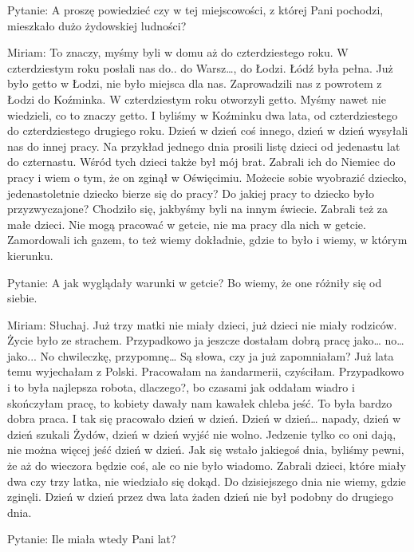  

Pytanie: A proszę powiedzieć czy w tej miejscowości, z której Pani pochodzi, mieszkało dużo żydowskiej ludności? 

Miriam: To znaczy, myśmy byli w domu aż do czterdziestego roku. W czterdziestym roku posłali nas do.. do Warsz…, do Łodzi. Łódź była pełna. Już było getto w Łodzi, nie było miejsca dla nas. Zaprowadzili nas z powrotem z Łodzi do Koźminka. W czterdziestym roku otworzyli getto. Myśmy nawet nie wiedzieli, co to znaczy getto. I byliśmy w Koźminku dwa lata, od czterdziestego do czterdziestego drugiego roku. Dzień w dzień coś innego, dzień w dzień wysyłali nas do innej pracy. Na przykład jednego dnia prosili listę dzieci od jedenastu lat do czternastu. Wśród tych dzieci także był mój brat. Zabrali ich do Niemiec do pracy i wiem o tym, że on zginął w Oświęcimiu. Możecie sobie wyobrazić dziecko, jedenastoletnie dziecko bierze się do pracy? Do jakiej pracy to dziecko było przyzwyczajone? Chodziło się, jakbyśmy byli na innym świecie. Zabrali też za małe dzieci. Nie mogą pracować w getcie, nie ma pracy dla nich w getcie. Zamordowali ich gazem, to też wiemy dokładnie, gdzie to było i wiemy, w którym kierunku. 

 

Pytanie: A jak wyglądały warunki w getcie? Bo wiemy, że one różniły się od siebie. 

Miriam: Słuchaj. Już trzy matki nie miały dzieci, już dzieci nie miały rodziców. Życie było ze strachem. Przypadkowo ja jeszcze dostałam dobrą pracę jako… no… jako... No chwileczkę, przypomnę… Są słowa, czy ja już zapomniałam? Już lata temu wyjechałam z Polski. Pracowałam na żandarmerii, czyściłam. Przypadkowo i to była najlepsza robota, dlaczego?, bo czasami jak oddałam wiadro i skończyłam pracę, to kobiety dawały nam kawałek chleba jeść. To była bardzo dobra praca. I tak się pracowało dzień w dzień. Dzień w dzień… napady, dzień w dzień szukali Żydów, dzień w dzień wyjść nie wolno. Jedzenie tylko co oni dają, nie można więcej jeść dzień w dzień. Jak się wstało jakiegoś dnia, byliśmy pewni, że aż do wieczora będzie coś, ale co nie było wiadomo. Zabrali dzieci, które miały dwa czy trzy latka, nie wiedziało się dokąd. Do dzisiejszego dnia nie wiemy, gdzie zginęli. Dzień w dzień przez dwa lata żaden dzień nie był podobny do drugiego dnia. 

 

Pytanie: Ile miała wtedy Pani lat? 

